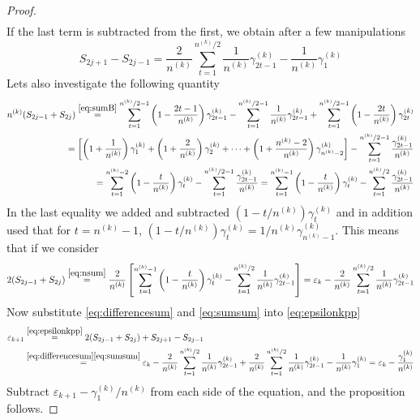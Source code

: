 \documentclass[11pt,english,a4paper]{article}
\begin{document}
\begin{proof}
\begin{align}
\end{align}
If the last term is subtracted from the first, we obtain after a few manipulations
\begin{equation}
S_{2j+1} - S_{2j-1} = \frac{2}{n^{(k)}} \sum_{t=1}^{n^{(k)}/2} \frac{1}{n^{(k)}} \gamma^{(k)}_{2t - 1} - \frac{1}{n^{(k)}} \gamma^{(k)}_{1} \label{eq:differencesum}
\end{equation}
Lets also investigate the following quantity
\begin{align}
n^{(k)}(S_{2j-1} + S_{2j}) \stackrel{\eqref{eq:sumB} }{=} \sum_{t=1}^{n^{(k)}/2-1} \left( 1 - \frac{2t-1}{n^{(k)}}\right) \gamma^{(k)}_{2t - 1} -  \sum_{t=1}^{n^{(k)}/2-1} \frac{1}{n^{(k)}} \gamma^{(k)}_{2t - 1} + \sum_{t=1}^{n^{(k)}/2-1} \left( 1 - \frac{2t}{n^{(k)}}\right) \gamma^{(k)}_{2t}\nonumber\\
=\left[ \left(1 + \frac{1}{n^{(k)}}\right)\gamma^{(k)}_1 + \left(1 + \frac{2}{n^{(k)}}\right)\gamma^{(k)}_2  + \cdots + \left(1 + \frac{n^{(k)} - 2}{n^{(k)}} \right)\gamma^{(k)}_{n^{(k)} -2 }\right]-  \sum_{t=1}^{n^{(k)}/2-1} \frac{\gamma^{(k)}_{2t - 1}}{n^{(k)}} \nonumber\\
= \sum_{t=1}^{n^{(k)} -2 } \left( 1 - \frac{t}{n^{(k)}} \right)\gamma^{(k)}_{t}-  \sum_{t=1}^{n^{(k)}/2-1} \frac{\gamma^{(k)}_{2t - 1}}{n^{(k)}} = \sum_{t=1}^{n^{(k)} -1 } \left( 1 - \frac{t}{n^{(k)}} \right)\gamma^{(k)}_{t} -  \sum_{t=1}^{n^{(k)}/2} \frac{\gamma^{(k)}_{2t - 1}}{n^{(k)}} \label{eq:nsum}
\end{align}
In the last equality we added and subtracted $(1-t/n^{(k)})\gamma^{(k)}_{t}$ and in addition used that for $t = n^{(k)} - 1$, $(1-t/n^{(k)})\gamma^{(k)}_{t} = 1/n^{(k)}\gamma^{(k)}_{n^{(k)} -1}$. This means that if we consider
\begin{align}
2(S_{2j-1} + S_{2j}) \stackrel{\eqref{eq:nsum}}{=} \frac{2}{n^{(k)}} \left[ \sum_{t=1}^{n^{(k)} -1 } \left( 1 - \frac{t}{n^{(k)}} \right)\gamma^{(k)}_{t} -  \sum_{t=1}^{n^{(k)}/2} \frac{1}{n^{(k)}} \gamma^{(k)}_{2t - 1} \right] = \varepsilon_k -\frac{2}{n^{(k)}} \sum_{t=1}^{n^{(k)}/2} \frac{1}{n^{(k)}} \gamma^{(k)}_{2t - 1} \label{eq:sumsum}
\end{align}
Now substitute \eqref{eq:differencesum} and \eqref{eq:sumsum} into \eqref{eq:epsilonkpp}
\begin{align*}
\varepsilon_{  k+1} &\stackrel{\eqref{eq:epsilonkpp}}{=} 2(S_{2j-1} + S_{2j}) + S_{2j+1} - S_{2j-1} \\
&\stackrel{\eqref{eq:differencesum} \eqref{eq:sumsum}}{=} \varepsilon_k -\frac{2}{n^{(k)}} \sum_{t=1}^{n^{(k)}/2} \frac{1}{n^{(k)}} \gamma^{(k)}_{2t - 1}  + \frac{2}{n^{(k)}} \sum_{t=1}^{n^{(k)}/2} \frac{1}{n^{(k)}} \gamma^{(k)}_{2t - 1} - \frac{1}{n^{(k)}} \gamma^{(k)}_{1}  = \varepsilon_k - \frac{\gamma^{(k)}_1 }{n^{(k)}}
\end{align*}
Subtract $\varepsilon_{  k+1} - \gamma^{(k)}_1/n^{(k)}$ from each side of the equation, and the proposition follows.
\end{proof}
\end{document}
